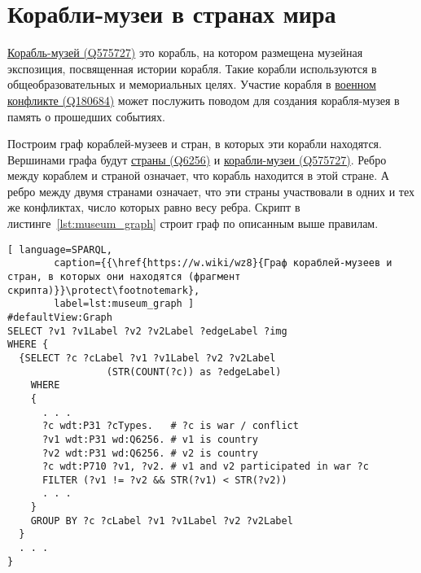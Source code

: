 \section{Корабли-музеи в странах мира}

\href{https://www.wikidata.org/wiki/Q575727}{Корабль-музей (Q575727)} это корабль, на котором размещена музейная экспозиция, посвященная истории корабля. Такие корабли используются в общеобразовательных и мемориальных целях. Участие корабля в \href{https://www.wikidata.org/wiki/Q180684}{военном конфликте (Q180684)} может послужить поводом для создания корабля-музея в память о прошедших событиях. 

Построим граф кораблей-музеев и стран, в которых эти корабли находятся. Вершинами графа будут \href{https://www.wikidata.org/wiki/Q6256}{страны (Q6256)} и \href{https://www.wikidata.org/wiki/Q575727}{корабли-музеи (Q575727)}. Ребро между кораблем и страной означает, что корабль находится в этой стране. А ребро между двумя странами означает, что эти страны участвовали в одних и тех же конфликтах, число которых равно весу ребра. Скрипт в листинге~\ref{lst:museum_graph} строит граф по описанным выше правилам.

\begin{lstlisting}[ language=SPARQL, 
        caption={{\href{https://w.wiki/wz8}{Граф кораблей-музеев и стран, в которых они находятся (фрагмент скрипта)}}\protect\footnotemark}, 
        label=lst:museum_graph ]
#defaultView:Graph
SELECT ?v1 ?v1Label ?v2 ?v2Label ?edgeLabel ?img
WHERE {
  {SELECT ?c ?cLabel ?v1 ?v1Label ?v2 ?v2Label 
                 (STR(COUNT(?c)) as ?edgeLabel) 
    WHERE
    {
      . . .
      ?c wdt:P31 ?cTypes.   # ?c is war / conflict
      ?v1 wdt:P31 wd:Q6256. # v1 is country
      ?v2 wdt:P31 wd:Q6256. # v2 is country
      ?c wdt:P710 ?v1, ?v2. # v1 and v2 participated in war ?c
      FILTER (?v1 != ?v2 && STR(?v1) < STR(?v2)) 
      . . .
    }
    GROUP BY ?c ?cLabel ?v1 ?v1Label ?v2 ?v2Label
  }
  . . .
}
\end{lstlisting}

